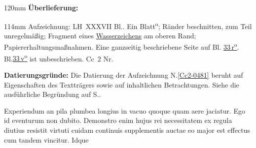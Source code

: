 %
\frenchspacing%
\begin{ledgroupsized}[r]{120mm}%
\footnotesize%
\pstart%
\noindent\textbf{Überlieferung:}%
\pend%
\end{ledgroupsized}%
\begin{ledgroupsized}[r]{114mm}%
\footnotesize%
\pstart%
\parindent -6mm%
%
Aufzeichnung:
LH~XXXVII Bl..
Ein Blatt\textsuperscript{o};
Ränder beschnitten, zum Teil unregelmäßig;
Fragment eines \href{\Scan{LH_37_04_033wz}}{Wasserzeichens} am oberen Rand;
Papiererhaltungsmaßnahmen.
Eine ganzseitig beschriebene Seite auf Bl.\;%
\href{\Scan{LH_37_04_033r}}{33\,r\textsuperscript{o}}.
Bl.\;\href{\Scan{LH_37_04_033v}}{33\,v\textsuperscript{o}} ist unbeschrieben.
\newline%
Cc~2 Nr.
\pend%
\end{ledgroupsized}%
\vspace{5mm}%
\begin{ledgroup}%
\footnotesize%
\pstart%
\noindent%
\textbf{Datierungsgründe:}
Die Datierung der Aufzeichnung N.\;\ref{Cc2-0481} beruht auf Eigenschaften des Textträgers sowie auf inhaltlichen Betrachtungen.
Siehe die ausführliche Begründung auf S.\;\pageref{Cc2-0481_dat}.%
\pend%
\end{ledgroup}%
%
\frenchspacing%
\vspace{8mm}%
\normalsize%
\pstart%
\noindent%
%
Experiendum
an pila plumbea%
longius in vacuo quoque%
quam
aere%
jaciatur.
Ego id eventurum non dubito.%
%
Demonstro enim hujus rei necessitatem%
ex regula
diutius resistit %
virtuti cuidam continuis supplementis auctae%
%
%
\bracks{,}
eo major est effectus%
cum tandem vincitur.%
%
\pend%
\pstart%
Idque
